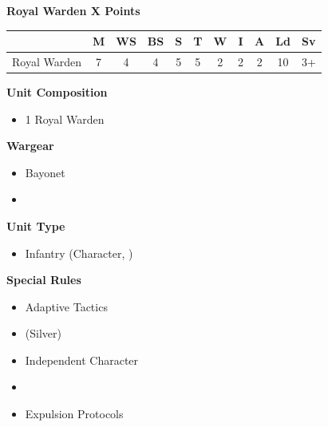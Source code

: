 \hspace{0.5em}


\newpage
\subsubsection[Royal Warden]{}
\begin{minipage}[t]{0.72\textwidth}
	{\large \textbf{Royal Warden \dotfill X Points}}
	
	\begin{tabular}{m{160 pt} *{10}{c}}
		& M & WS & BS & S & T & W & I & A & Ld & Sv \\
		\hline
		Royal Warden & 7 & 4 & 4 & 5 & 5 & 2 & 2 & 2 & 10 & 3+ \\
	\end{tabular}
	\small
	\begin{minipage}[t]{0.5\textwidth}
		\begin{flushleft}
		\vspace*{2em}
		\textbf{Unit Composition}
		\begin{itemize}
			\item 1 Royal Warden
		\end{itemize}
		
		\textbf{Wargear}
		\begin{itemize}
			\item Bayonet
			\item {}
		\end{itemize}
		\end{flushleft}
	\end{minipage}
	\begin{minipage}{0.5\textwidth}
		\vspace*{2em}
		\textbf{Unit Type}
		\begin{itemize}
			\item Infantry (Character, )
		\end{itemize}
		
		\textbf{Special Rules}
		\begin{itemize}
			\item Adaptive Tactics
			\item {} (Silver)
			\item Independent Character
			\item {}
			\item Expulsion Protocols
		\end{itemize}
	\end{minipage}
	

\end{minipage}
